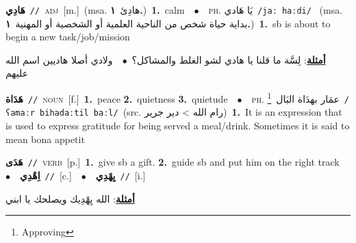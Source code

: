 \documentclass[10pt,a4paper,twoside]{article} %
\begin{document}
\begin{multicols}{2}
{\setlength\topsep{0pt}\textbf{\foreignlanguage{arabic}{هَادِي}}\ {\color{gray}\texttt{//}\color{black}}\ \textsc{adj}\ [m.]\ \color{gray}(msa. \foreignlanguage{arabic}{هادِئ}~\foreignlanguage{arabic}{\textbf{١.}})\color{black}\ \textbf{1.}~calm\ \ $\bullet$\ \ \textsc{ph.} \color{gray} \foreignlanguage{arabic}{يَا هَادي}\color{black}\ {\color{gray}\texttt{/{\sffamily jaː haːdi}/}\color{black}}\ \color{gray} (msa. \foreignlanguage{arabic}{بداية حياة شخص من الناحية العلمية أو الشخصية أو المهنية}~\foreignlanguage{arabic}{\textbf{١.}})\color{black}\ \textbf{1.}~sb is about to begin a new task/job/mission\  \begin{flushright}\color{gray}\foreignlanguage{arabic}{\textbf{\underline{\foreignlanguage{arabic}{أمثلة}}}: لِسَّة ما قلنا يا هادي لشو الغلط والمشاكل؟\ $\bullet$\ \  ولادي أصلا هاديين اسم الله عليهم}\end{flushright}\color{black}} \vspace{2mm}

{\setlength\topsep{0pt}\textbf{\foreignlanguage{arabic}{هَدَاة}}\ {\color{gray}\texttt{//}\color{black}}\ \textsc{noun}\ [f.]\ \textbf{1.}~peace  \textbf{2.}~quietness  \textbf{3.}~quietude\ \ $\bullet$\ \ \textsc{ph.} \color{gray} \foreignlanguage{arabic}{عمَار بهدَاة البَال}\color{black}\ \footnote{Approving}\ {\color{gray}\texttt{/{\sffamily ʕamaːr bihadaːtil baːl}/}\color{black}}\ \color{gray}(src. \foreignlanguage{arabic}{رام الله > دير جرير})\color{black}\ \textbf{1.}~It is an expression that is used to express gratitude for being served a meal/drink. Sometimes it is said to mean bona appetit\ } \vspace{2mm}

{\setlength\topsep{0pt}\textbf{\foreignlanguage{arabic}{هَدَى}}\ {\color{gray}\texttt{//}\color{black}}\ \textsc{verb}\ [p.]\ \textbf{1.}~give sb a gift.  \textbf{2.}~guide sb and put him on the right track\ \ $\bullet$\ \ \setlength\topsep{0pt}\textbf{\foreignlanguage{arabic}{اِهْدِي}}\ {\color{gray}\texttt{//}\color{black}}\ [c.]\ \ $\bullet$\ \ \setlength\topsep{0pt}\textbf{\foreignlanguage{arabic}{يِهْدِي}}\ {\color{gray}\texttt{//}\color{black}}\ [i.]\  \begin{flushright}\color{gray}\foreignlanguage{arabic}{\textbf{\underline{\foreignlanguage{arabic}{أمثلة}}}: الله يِهْدِيك ويصلحك يا ابني}\end{flushright}\color{black}} \vspace{2mm}


\end{multicols}
\end{document}
